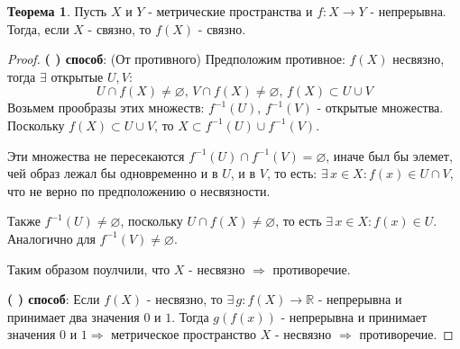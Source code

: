 \documentclass[12pt]{article}
\newcommand{\RN}[1]{%
	\textup{\uppercase\expandafter{\romannumeral#1}}%
}
\newcommand{\MR}{\mathbb{R}}
\newcommand{\VN}{\varnothing}
\theoremstyle{definition}
\newtheorem{theorem}{Теорема}
\begin{document}
\begin{theorem}
	Пусть $X$ и $Y$ - метрические пространства и $f \colon X \to Y$ - непрерывна. Тогда, если $X$ - связно, то $f(X)$ - связно. 
\end{theorem}
\begin{proof}
	\textbf{(\RN{1}) способ}: (От противного) Предположим противное: $f(X)$ несвязно, тогда $\exists$ открытые $U,V$:
	$$
		U \cap f(X) \neq \VN, \, V \cap f(X) \neq \VN, \, f(X) \subset U \cup V
	$$
	Возьмем прообразы этих множеств: $f^{-1}(U)$, $f^{-1}(V)$ - открытые множества. Поскольку $f(X) \subset U \cup V$, то $X \subset f^{-1}(U) \cup f^{-1}(V)$. 
	
	Эти множества не пересекаются $f^{-1}(U) \cap f^{-1}(V) = \VN$, иначе был бы элемет, чей образ лежал бы одновременно и в $U$, и в $V$, то есть: $\exists \, x \in X \colon f(x) \in U \cap V$, что не верно по предположению о несвязности.
	
	Также $f^{-1}(U)\neq \VN$, поскольку $U \cap f(X) \neq \VN$, то есть $\exists \, x \in X \colon f(x) \in U$. Аналогично для $f^{-1}(V) \neq \VN$.
	
	Таким образом поулчили, что $X$ - несвязно $\Rightarrow$ противоречие.
	
	\textbf{(\RN{2}) способ}: Если $f(X)$ - несвязно, то $\exists \, g \colon f(X) \to \MR$ - непрерывна и принимает два значения $0$ и $1$. Тогда $g(f(x))$ - непрерывна и принимает значения $0$ и $1 \Rightarrow$ метрическое пространство $X$ - несвязно $\Rightarrow$ противоречие.
\end{proof}
\end{document}
